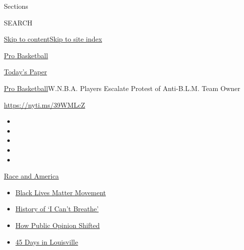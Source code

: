Sections

SEARCH

\protect\hyperlink{site-content}{Skip to
content}\protect\hyperlink{site-index}{Skip to site index}

\href{https://www.nytimes.com/section/sports/basketball}{Pro Basketball}

\href{https://myaccount.nytimes.com/auth/login?response_type=cookie\&client_id=vi}{}

\href{https://www.nytimes.com/section/todayspaper}{Today's Paper}

\href{/section/sports/basketball}{Pro Basketball}\textbar{}W.N.B.A.
Players Escalate Protest of Anti-B.L.M. Team Owner

\url{https://nyti.ms/39WMLcZ}

\begin{itemize}
\item
\item
\item
\item
\item
\end{itemize}

\href{https://www.nytimes.com/news-event/george-floyd-protests-minneapolis-new-york-los-angeles?action=click\&pgtype=Article\&state=default\&region=TOP_BANNER\&context=storylines_menu}{Race
and America}

\begin{itemize}
\tightlist
\item
  \href{https://www.nytimes.com/interactive/2020/07/03/us/george-floyd-protests-crowd-size.html?action=click\&pgtype=Article\&state=default\&region=TOP_BANNER\&context=storylines_menu}{Black
  Lives Matter Movement}
\item
  \href{https://www.nytimes.com/interactive/2020/06/28/us/i-cant-breathe-police-arrest.html?action=click\&pgtype=Article\&state=default\&region=TOP_BANNER\&context=storylines_menu}{History
  of `I Can't Breathe'}
\item
  \href{https://www.nytimes.com/interactive/2020/06/10/upshot/black-lives-matter-attitudes.html?action=click\&pgtype=Article\&state=default\&region=TOP_BANNER\&context=storylines_menu}{How
  Public Opinion Shifted}
\item
  \href{https://www.nytimes.com/interactive/2020/07/16/us/black-lives-matter-protests-louisville-breonna-taylor.html?action=click\&pgtype=Article\&state=default\&region=TOP_BANNER\&context=storylines_menu}{45
  Days in Louisville}
\end{itemize}

